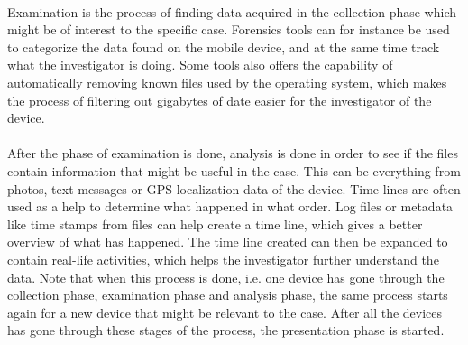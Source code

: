 \\
Examination is the process of finding data acquired in the collection phase which might be of interest to the specific case. Forensics tools can for instance be used to categorize the data found on the mobile device, and at the same time track what the investigator is doing. Some tools also offers the capability of automatically removing known files used by the operating system, which makes the process of filtering out gigabytes of date easier for the investigator of the device.\\
\\
After the phase of examination is done, analysis is done in order to see if the files contain information that might be useful in the case. This can be everything from photos, text messages or GPS localization data of the device. Time lines are often used as a help to determine what happened in what order. Log files or metadata like time stamps from files can help create a time line, which gives a better overview of what has happened. The time line created can then be expanded to contain real-life activities, which helps the investigator further understand the data. Note that when this process is done, i.e. one device has gone through the collection phase, examination phase and analysis phase, the same process starts again for a new device that might be relevant to the case. After all the devices has gone through these stages of the process, the presentation phase is started.
